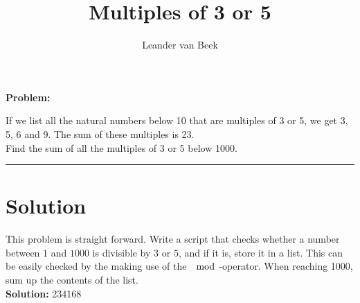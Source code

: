 \documentclass[10pt,a4paper]{article}
\author{Leander van Beek}
\title{Multiples of 3 or 5}
\begin{document}
\maketitle

\textbf{Problem:} 

If we list all the natural numbers below 10 that are multiples of 3 or 5, we get 3, 5, 6 and 9. The sum of these multiples is 23.\\

Find the sum of all the multiples of 3 or 5 below 1000.

\vspace{0.5cm}
\hrule
\vspace{0.5cm}

\section{Solution}

This problem is straight forward. Write a script that checks whether a number between $1$ and $1000$ is divisible by $3$ or $5$, and if it is, store it in a list. This can be easily checked by the making use of the $\mod$-operator. When reaching 1000, sum up the contents of the list.\\

\textbf{Solution:} 234168
\end{document}
